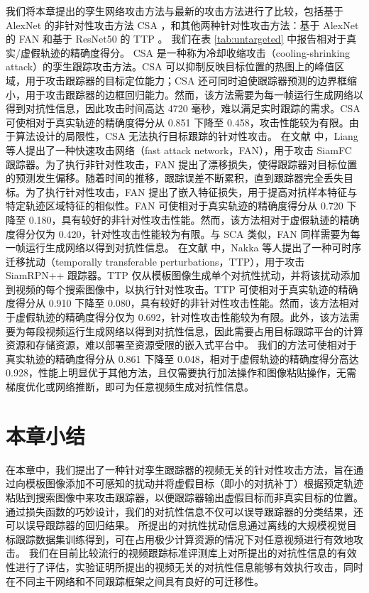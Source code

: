 我们将本章提出的孪生网络攻击方法与最新的攻击方法进行了比较，包括基于 AlexNet 的非针对性攻击方法 CSA \cite{CSA}，和其他两种针对性攻击方法：基于 AlexNet 的 FAN \cite{FAN} 和基于 ResNet50 的 TTP \cite{TTP}。
我们在表 \ref{tab:untargeted} 中报告相对于真实/虚假轨迹的精确度得分。
CSA \cite{CSA} 是一种称为冷却收缩攻击（cooling-shrinking attack）的孪生跟踪攻击方法。CSA 可以抑制反映目标位置的热图上的峰值区域，用于攻击跟踪器的目标定位能力；CSA 还可同时迫使跟踪器预测的边界框缩小，用于攻击跟踪器的边框回归能力。然而，该方法需要为每一帧运行生成网络以得到对抗性信息，因此攻击时间高达 4720 毫秒，难以满足实时跟踪的需求。CSA 可使相对于真实轨迹的精确度得分从 0.851 下降至 0.458，攻击性能较为有限。由于算法设计的局限性，CSA 无法执行目标跟踪的针对性攻击。
在文献 \cite{FAN} 中，Liang 等人提出了一种快速攻击网络（fast attack network，FAN），用于攻击 SiamFC 跟踪器。为了执行非针对性攻击，FAN 提出了漂移损失，使得跟踪器对目标位置的预测发生偏移。随着时间的推移，跟踪误差不断累积，直到跟踪器完全丢失目标。为了执行针对性攻击，FAN 提出了嵌入特征损失，用于提高对抗样本特征与特定轨迹区域特征的相似性。FAN 可使相对于真实轨迹的精确度得分从 0.720 下降至 0.180，具有较好的非针对性攻击性能。然而，该方法相对于虚假轨迹的精确度得分仅为 0.420，针对性攻击性能较为有限。与 SCA 类似，FAN 同样需要为每一帧运行生成网络以得到对抗性信息。
在文献 \cite{TTP} 中，Nakka 等人提出了一种可时序迁移扰动（temporally transferable perturbations，TTP），用于攻击 SiamRPN++ 跟踪器。TTP 仅从模板图像生成单个对抗性扰动，并将该扰动添加到视频的每个搜索图像中，以执行针对性攻击。TTP 可使相对于真实轨迹的精确度得分从 0.910 下降至 0.080，具有较好的非针对性攻击性能。然而，该方法相对于虚假轨迹的精确度得分仅为 0.692，针对性攻击性能较为有限。此外，该方法需要为每段视频运行生成网络以得到对抗性信息，因此需要占用目标跟踪平台的计算资源和存储资源，难以部署至资源受限的嵌入式平台中。
我们的方法可使相对于真实轨迹的精确度得分从 0.861 下降至 0.048，相对于虚假轨迹的精确度得分高达 0.928，性能上明显优于其他方法，且仅需要执行加法操作和图像粘贴操作，无需梯度优化或网络推断，即可为任意视频生成对抗性信息。

\section{本章小结}

在本章中，我们提出了一种针对孪生跟踪器的视频无关的针对性攻击方法，旨在通过向模板图像添加不可感知的扰动并将虚假目标（即小的对抗补丁）根据预定轨迹粘贴到搜索图像中来攻击跟踪器，以便跟踪器输出虚假目标而非真实目标的位置。
通过损失函数的巧妙设计，我们的对抗性信息不仅可以误导跟踪器的分类结果，还可以误导跟踪器的回归结果。
所提出的对抗性扰动信息通过离线的大规模视觉目标跟踪数据集训练得到，可在占用极少计算资源的情况下对任意视频进行有效地攻击。
我们在目前比较流行的视频跟踪标准评测库上对所提出的对抗性信息的有效性进行了评估，实验证明所提出的视频无关的对抗性信息能够有效执行攻击，同时在不同主干网络和不同跟踪框架之间具有良好的可迁移性。